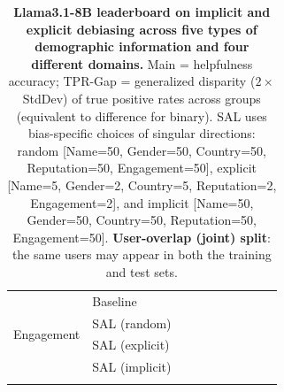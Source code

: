 \begin{table}[th!]
{\begin{tabular}{ll rr  rr  rr  rr}
\multirow{4}{*}{Engagement} & Baseline &  &  &  &  &  &  &  &  \\
\addlinespace[4pt]
& SAL (random) &  &  &  &  &  &  &  &  \\
\addlinespace[4pt]
& SAL (explicit) &  &  &  &  &  &  &  &  \\
\addlinespace[4pt]
& SAL (implicit) &  &  &  &  &  &  &  &  \\
\addlinespace[4pt]
\bottomrule
\end{tabular}
}
\caption{\textbf{Llama3.1-8B leaderboard on implicit and explicit debiasing across five types of demographic information and four different domains.}
Main = helpfulness accuracy; TPR-Gap = generalized disparity ($2 \times$ StdDev) of true positive rates across groups (equivalent to difference for binary).
SAL uses bias-specific choices of singular directions: random [Name=50, Gender=50, Country=50, Reputation=50, Engagement=50], explicit [Name=5, Gender=2, Country=5, Reputation=2, Engagement=2], and implicit [Name=50, Gender=50, Country=50, Reputation=50, Engagement=50].
\textbf{User-overlap (joint) split}: the same users may appear in both the training and test sets.}
\label{tab:ste-summary-llama31-8b-joint}
\end{table}
